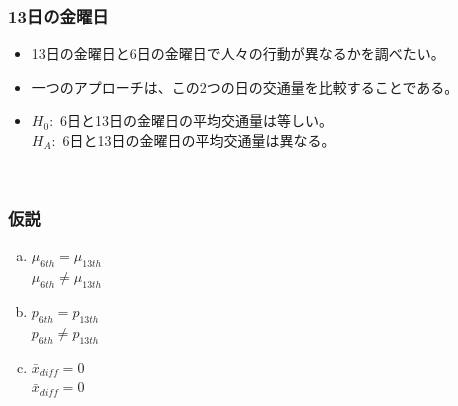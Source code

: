 
\begin{frame}
\frametitle{13日の金曜日}

\begin{itemize}

\item 13日の金曜日と6日の金曜日で人々の行動が異なるかを調べたい。

\item 一つのアプローチは、この2つの日の交通量を比較することである。

\item $H_0:$ 6日と13日の金曜日の平均交通量は等しい。\\
$H_A:$ 6日と13日の金曜日の平均交通量は異なる。

\end{itemize}

$\:$ \\



\end{frame}


\begin{frame}
\frametitle{仮説}


\begin{enumerate}[(a)]
\item  {} $\mu_{6th} = \mu_{13th}$ \\
 $\mu_{6th} \ne \mu_{13th}$
\item  {} $p_{6th} = p_{13th}$ \\
 $p_{6th} \ne p_{13th}$
\item  {} $\bar{x}_{diff} = 0$ \\
 $\bar{x}_{diff} = 0$
\end{enumerate}

\end{frame}


